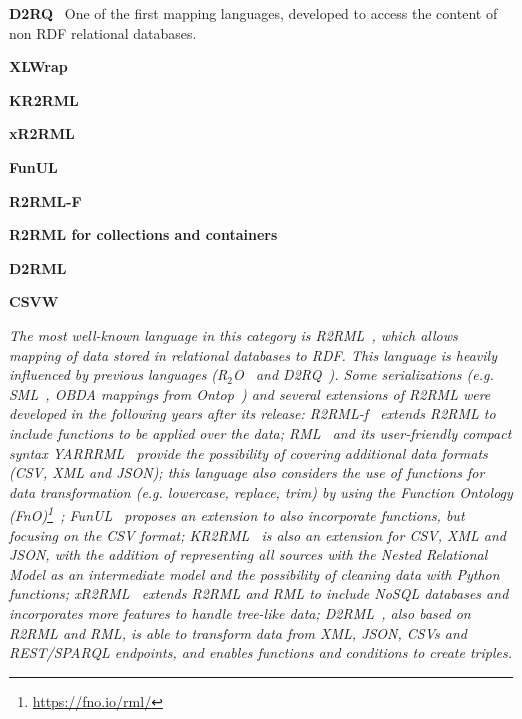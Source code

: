 \noindent\textbf{D2RQ}~\parencite{bizer2004d2rq} One of the first mapping languages, developed to access the content of non RDF relational databases. 

\noindent\textbf{XLWrap}~\parencite{langegger2009xlwrap}

\noindent\textbf{KR2RML}~\parencite{slepicka2015kr2rml}

\noindent\textbf{xR2RML}~\parencite{michel2015xr2rml}

\noindent\textbf{FunUL}~\parencite{junior2016funul}

\noindent\textbf{R2RML-F}~\parencite{debruyne2016r2rmlf}

\noindent\textbf{R2RML for collections and containers}~\parencite{debruyne2017R2RML-collections}

\noindent\textbf{D2RML}~\parencite{chortaras2018d2rml}

\noindent\textbf{CSVW}~\parencite{Tennison2015csvw}

\textit{The most well-known language in this category is R2RML~\parencite{das2012r2rml}, which allows mapping of data stored in relational databases to RDF. This language is heavily influenced by previous languages (R$_2$O~\parencite{barrasa2004r2o} and D2RQ~\parencite{bizer2004d2rq}). Some serializations (e.g. SML~\parencite{Stadler2015sml}, OBDA mappings from Ontop~\parencite{rodriguez2015efficient}) and several extensions of R2RML were developed in the following years after its release: R2RML-f~\parencite{debruyne2016r2rmlf} extends R2RML to include functions to be applied over the data; RML~\parencite{Dimou2014rml} and its user-friendly compact syntax YARRRML~\parencite{Heyvaert2018yarrrml} provide the possibility of covering additional data formats (CSV, XML and JSON); this language also considers the use of functions for data transformation (e.g. lowercase, replace, trim) by using the Function Ontology (FnO)\footnote{\url{https://fno.io/rml/}}~\parencite{DeMeester2017fno_dbpedia}; FunUL~\parencite{junior2016funul} proposes an extension to also incorporate functions, but focusing on the CSV format; KR2RML~\parencite{slepicka2015kr2rml} is also an extension for CSV, XML and JSON, with the addition of representing all sources with the Nested Relational Model as an intermediate model and the possibility of cleaning data with Python functions; xR2RML~\parencite{michel2015xr2rml} extends R2RML and RML to include NoSQL databases and incorporates more features to handle tree-like data; D2RML~\parencite{chortaras2018d2rml}, also based on R2RML and RML, is able to transform data from XML, JSON, CSVs and REST/SPARQL endpoints, and enables functions and conditions to create triples. }

